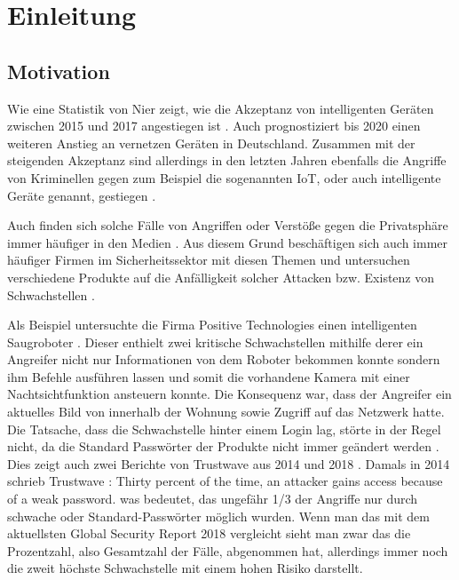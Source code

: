 \chapter{Einleitung}

\section{Motivation}
Wie eine Statistik von Nier zeigt, wie die Akzeptanz von intelligenten Geräten zwischen 2015 und 2017 angestiegen ist \cite{nier_2017}. Auch \cite{weitemeyer_2018} prognostiziert bis 2020 einen weiteren Anstieg an vernetzen Geräten in Deutschland.
Zusammen mit der steigenden Akzeptanz sind allerdings in den letzten Jahren ebenfalls die Angriffe von Kriminellen gegen zum Beispiel die sogenannten \ac{IoT}, oder auch intelligente Geräte genannt, gestiegen  \cite{statista_2019}.

Auch finden sich solche Fälle von Angriffen oder Verstöße gegen die Privatsphäre immer häufiger in den Medien \cite{holland_2016} \cite{it_verlag_informationstechnik_gmbh_2018}. Aus diesem Grund beschäftigen sich auch immer häufiger Firmen im Sicherheitssektor mit diesen Themen und untersuchen verschiedene Produkte auf die Anfälligkeit solcher Attacken bzw. Existenz von Schwachstellen \cite{lorenz_2018} \cite{ao_kaspersky_lab_2018}.

Als Beispiel untersuchte die Firma Positive Technologies einen intelligenten Saugroboter \cite{salmi_2017}.
Dieser enthielt zwei kritische Schwachstellen mithilfe derer ein Angreifer nicht nur Informationen von dem Roboter bekommen konnte sondern ihm Befehle ausführen lassen und somit die vorhandene Kamera mit einer Nachtsichtfunktion ansteuern konnte. Die Konsequenz war, dass der Angreifer ein aktuelles Bild von innerhalb der Wohnung sowie Zugriff auf das Netzwerk hatte. Die Tatsache, dass die Schwachstelle hinter einem Login lag, störte in der Regel nicht, da die Standard Passwörter der Produkte nicht immer geändert werden \cite{positive_technologies_2018}.
Dies zeigt auch zwei Berichte von Trustwave aus 2014 und 2018 \cite{trustwave_holdings_inc_2014} \cite{trustwave_holdings_inc_2018}.
Damals in 2014 schrieb Trustwave \cite{trustwave_holdings_inc_2014}: \glqq Thirty percent of the time, an attacker gains access because of a weak password.\grqq{}
was bedeutet, das ungefähr 1/3 der Angriffe nur durch schwache oder Standard-Passwörter möglich wurden. Wenn man das mit dem aktuellsten Global Security Report 2018 vergleicht sieht man zwar das die Prozentzahl, also Gesamtzahl der Fälle, abgenommen hat, allerdings immer noch die zweit höchste Schwachstelle mit einem hohen Risiko darstellt.

